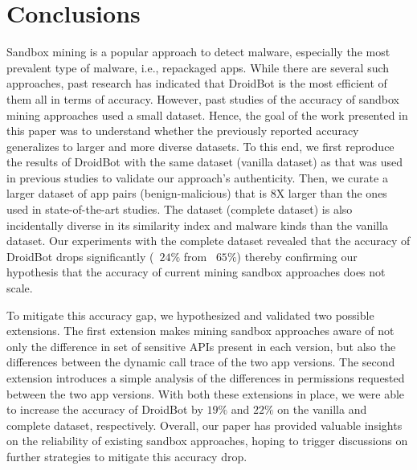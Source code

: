 \section{Conclusions}\label{sec:conclusions}


Sandbox mining is a popular approach to detect malware, especially the most prevalent type of malware, i.e., repackaged apps. While there are several such approaches, past research has indicated that DroidBot is the most efficient of them all in terms of accuracy. However, past studies of the accuracy of sandbox mining approaches used a small dataset. 
Hence, the goal of the work presented in this paper was to understand whether the previously reported accuracy generalizes to larger and more diverse datasets. To this end, we first reproduce the results of DroidBot with the same dataset (vanilla dataset) as that was used in previous studies to validate our approach's authenticity. Then, we curate a larger dataset of app pairs (benign-malicious) that is 8X larger than the ones used in state-of-the-art studies. The dataset (complete dataset) is also incidentally diverse in its similarity index and malware kinds than the vanilla dataset. Our experiments with the complete dataset revealed that the accuracy of DroidBot drops significantly (~$24\%$ from ~$65\%$) thereby confirming our hypothesis that the accuracy of current mining sandbox approaches does not scale.
      
To mitigate this accuracy gap, we hypothesized and validated two possible extensions. The first extension makes mining sandbox approaches aware of not only the difference in set of sensitive APIs present in each version, but also the differences between the dynamic call trace of the two app versions. The second extension introduces a simple analysis of the differences in permissions requested between the two app versions. With both these extensions in place, we were able to increase the accuracy of DroidBot by $19\%$ and $22\%$ on the vanilla and complete dataset, respectively. 
Overall, our paper has provided valuable insights on the reliability of existing sandbox approaches, hoping to trigger discussions on further strategies to mitigate this accuracy drop. 



